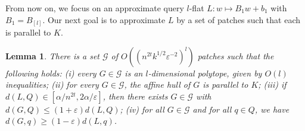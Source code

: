 \documentclass[a4paper,11pt]{paper}
\newcommand{\eps}{\varepsilon}
\newtheorem{lemma}[theorem]{Lemma}
\begin{document}
From now on, we focus on an approximate query $l$-flat
$L: w \mapsto B_1w + b_1$ with $B_1 = B_{[l]}$.
Our next goal is to approximate $L$  by a set of patches such
that each is parallel to $K$.

\begin{lemma}\label{lem:patches}
  There is a set $\mathcal{G}$  of $O((n^{2t}k^{1/2}\eps^{-2})^l)$
  patches such
  that the following holds:
  (i) every $G \in \mathcal{G}$ is an $l$-dimensional
    polytope, given by $O(l)$ inequalities;
  (ii) for every $G \in \mathcal{G}$,
  the affine hull of $G$ is parallel to $K$;
  (iii) if $d(L, Q) \in [\alpha/n^{2t}, 2\alpha/\eps]$,
  then there exists $G \in \mathcal{G}$ with
  $d(G, Q) \leq (1 + \eps)d(L, Q)$;
  (iv) for all $G \in \mathcal{G}$ and for all $q \in Q$, we have
  $d(G, q) \geq (1 - \eps)d(L, q)$.
\end{lemma}
\end{document}
